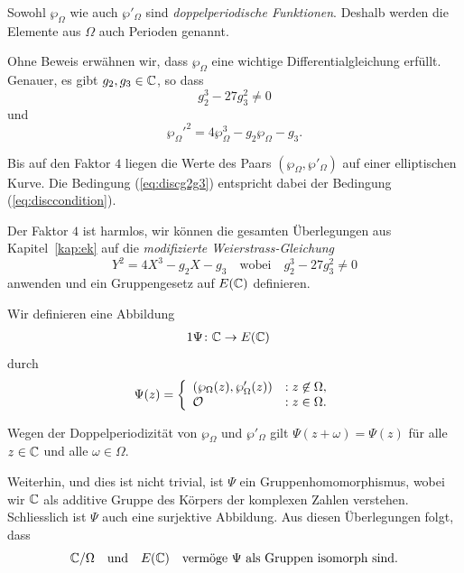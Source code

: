 \begin{bemerkung}
  Sowohl $\wp_\Omega$ wie auch $\wp'_\Omega$ sind \emph{doppelperiodische
    Funktionen}. Deshalb werden die Elemente aus $\Omega$ auch
  Perioden genannt. 
\end{bemerkung}

Ohne Beweis erwähnen wir, dass $\wp_\Omega$ eine wichtige
Differentialgleichung erfüllt. Genauer, es gibt $g_2,g_3\in{\mathbb{C}}$, so
dass
\begin{equation}
  \label{eq:discg2g3}
  g_2^3-27g_3^2 \not=0
\end{equation}
und 
\begin{equation}
  \label{eq:weierstrassdgl}
  {\wp_\Omega'}^2  = 4 \wp_\Omega^3 - g_2\wp_\Omega - g_3.  
\end{equation}


Bis auf den Faktor $4$ liegen die Werte des Paars
$(\wp_\Omega,\wp'_\Omega)$ auf einer elliptischen Kurve. 
Die Bedingung (\ref{eq:discg2g3}) entspricht dabei der Bedingung
(\ref{eq:disccondition}).

Der Faktor $4$ ist harmlos, wir können die gesamten Überlegungen aus
Kapitel~\ref{kap:ek} auf die \emph{modifizierte Weierstrass-Gleichung}
\begin{equation}
  \label{eq:modweierstrass}
  Y^2 = 4X^3-g_2X-g_3 \quad\text{wobei}\quad   g_2^3-27g_3^2 \not=0
\end{equation}
anwenden und ein Gruppengesetz auf $E({\mathbb{C}})$ definieren.

Wir definieren eine Abbildung
\begin{alignat*}1
  \Psi \colon &\IC\rightarrow E(\IC)
\end{alignat*}
durch
\begin{equation*}
  \Psi(z) = \left\{
    \begin{array}{ll}
      (\wp_\Omega(z),\wp'_\Omega(z)) &: z\not\in\Omega, \\
      {\mathcal O} &:z\in \Omega.
    \end{array}\right.
\end{equation*}

Wegen der Doppelperiodizität von $\wp_\Omega$ und $\wp'_\Omega$
gilt $\Psi(z+\omega) = \Psi(z)$ für alle $z\in{\mathbb{C}}$ und alle
$\omega\in\Omega$.

Weiterhin, und dies ist nicht trivial, ist $\Psi$ ein
Gruppenhomomorphismus, wobei wir ${\mathbb{C}}$ als additive Gruppe des Körpers
der komplexen Zahlen verstehen. Schliesslich ist $\Psi$ auch eine
surjektive Abbildung. Aus diesen Überlegungen folgt, dass
\begin{equation*}
  {\mathbb{C}}/\Omega \quad\text{und}\quad E({\mathbb{C}})\quad\text{vermöge $\Psi$ als Gruppen isomorph sind.}
\end{equation*}

